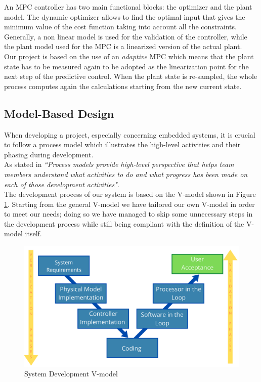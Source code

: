 An MPC controller has two main functional blocks: the optimizer and the plant model.
The dynamic optimizer allows to find the optimal input that gives the minimum
value of the cost function taking into account all the constraints. Generally, a non linear model is used for the validation of the controller, while the plant model used for the MPC is a linearized version of the actual plant.\\
Our project is based on the use of an \emph{adaptive} MPC which means that the plant state has to be measured again to be adopted as the linearization point for the next step of the predictive control. When the plant state is re-sampled, the whole process
computes again the calculations starting from the new current state.

\subsection{Model-Based Design}
When developing a project, especially concerning embedded systems, it is crucial to follow a process model which illustrates the high-level activities and their phasing during development.\\
As stated in \cite{FOWLER20151} \emph{``Process models provide high-level perspective that helps team members understand what activities to do and what progress  has been made on each of those development activities"}.\\
The development process of our system is based on the V-model shown in Figure \ref{fig:V_model}.
Starting from the general V-model we have tailored our own V-model in order to meet our needs; doing so we have managed to skip some unnecessary steps in the development process while still being compliant with the definition of the V-model itself.

\begin{figure}[H]
    \centering
    \includegraphics[width=1\textwidth]{Figures/V-MODEL.png}
    \caption{System Development V-model}
    
    \label{fig:V_model}
\end{figure}

